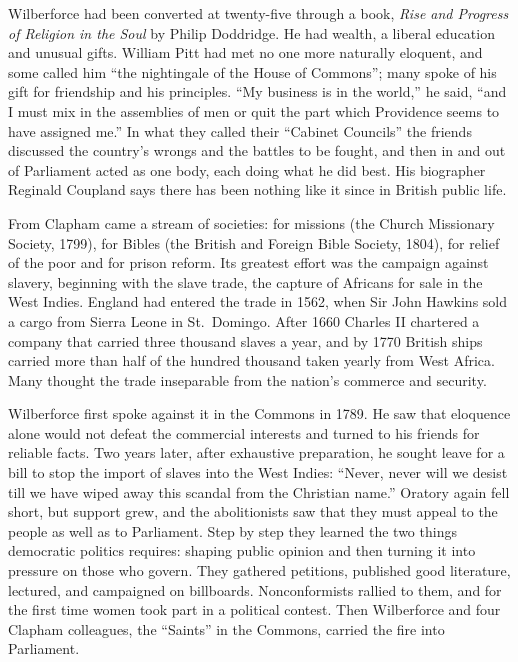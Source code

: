 Wilberforce had been converted at twenty-five through a book, \emph{Rise and Progress of Religion in the Soul} by Philip Doddridge. He had wealth, a liberal education and unusual gifts. William Pitt
had met no one more naturally eloquent, and some called him ``the nightingale of the
House of Commons''; many spoke of his gift for friendship and his principles. ``My business is in the
world,'' he said, ``and I must mix in the assemblies of men or quit the part which Providence seems
to have assigned me.'' In what they called their ``Cabinet Councils'' the friends discussed the
country's wrongs and the battles to be fought, and then in and out of Parliament acted as one body,
each doing what he did best. His biographer Reginald Coupland says there has been nothing like it
since in British public life.

From Clapham came a stream of societies: for missions (the Church Missionary Society, 1799), for Bibles (the British and Foreign Bible Society, 1804), for relief of the poor and for prison reform. Its greatest effort was the campaign against slavery, beginning with the
slave trade, the capture of Africans for sale in the West Indies. England had entered the trade in
1562, when Sir John Hawkins sold a cargo from Sierra Leone in St.~Domingo. After 1660 Charles II
chartered a company that carried three thousand slaves a year, and by 1770 British ships carried more
than half of the hundred thousand taken yearly from West Africa. Many thought the trade inseparable
from the nation's commerce and security.

Wilberforce first spoke against it in the Commons in 1789. He saw that eloquence alone would not
defeat the commercial interests and turned to his friends for reliable facts. Two years later, after
exhaustive preparation, he sought leave for a bill to stop the import of slaves into the West Indies:
``Never, never will we desist till we have wiped away this scandal from the Christian name.'' Oratory
again fell short, but support grew, and the abolitionists saw that they must appeal to the people as
well as to Parliament. Step by step they learned the two things democratic politics requires: shaping public opinion and then turning it into pressure on those who govern. They gathered petitions, published
good literature, lectured, and campaigned on billboards. Nonconformists rallied to them, and for the
first time women took part in a political contest. Then Wilberforce and four Clapham colleagues, the
``Saints'' in the Commons, carried the fire into Parliament.

